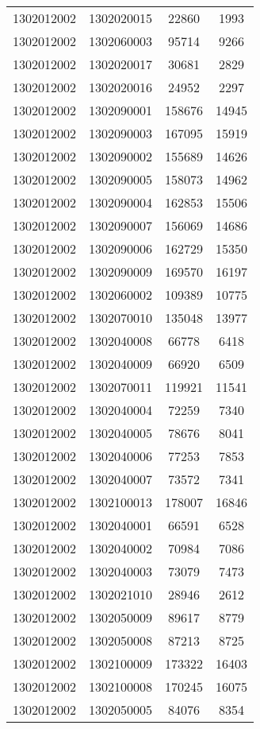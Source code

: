 \begin{longtable}[h]{llcc}
		1302012002 & 1302020015 & 22860 & 1993\\
		1302012002 & 1302060003 & 95714 & 9266\\
		1302012002 & 1302020017 & 30681 & 2829\\
		1302012002 & 1302020016 & 24952 & 2297\\
		1302012002 & 1302090001 & 158676 & 14945\\
		1302012002 & 1302090003 & 167095 & 15919\\
		1302012002 & 1302090002 & 155689 & 14626\\
		1302012002 & 1302090005 & 158073 & 14962\\
		1302012002 & 1302090004 & 162853 & 15506\\
		1302012002 & 1302090007 & 156069 & 14686\\
		1302012002 & 1302090006 & 162729 & 15350\\
		1302012002 & 1302090009 & 169570 & 16197\\
		1302012002 & 1302060002 & 109389 & 10775\\
		1302012002 & 1302070010 & 135048 & 13977\\
		1302012002 & 1302040008 & 66778 & 6418\\
		1302012002 & 1302040009 & 66920 & 6509\\
		1302012002 & 1302070011 & 119921 & 11541\\
		1302012002 & 1302040004 & 72259 & 7340\\
		1302012002 & 1302040005 & 78676 & 8041\\
		1302012002 & 1302040006 & 77253 & 7853\\
		1302012002 & 1302040007 & 73572 & 7341\\
		1302012002 & 1302100013 & 178007 & 16846\\
		1302012002 & 1302040001 & 66591 & 6528\\
		1302012002 & 1302040002 & 70984 & 7086\\
		1302012002 & 1302040003 & 73079 & 7473\\
		1302012002 & 1302021010 & 28946 & 2612\\
		1302012002 & 1302050009 & 89617 & 8779\\
		1302012002 & 1302050008 & 87213 & 8725\\
		1302012002 & 1302100009 & 173322 & 16403\\
		1302012002 & 1302100008 & 170245 & 16075\\
		1302012002 & 1302050005 & 84076 & 8354\\

\end{longtable}
